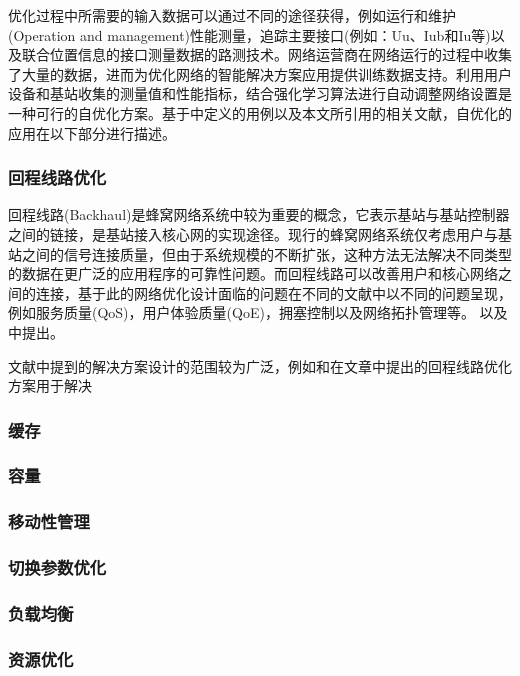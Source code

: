 \documentclass{IEEEtran}
\begin{document}
优化过程中所需要的输入数据可以通过不同的途径获得，例如运行和维护(Operation and management)性能测量，追踪主要接口(例如：Uu、Iub和Iu等)以及联合位置信息的接口测量数据的路测技术。网络运营商在网络运行的过程中收集了大量的数据，进而为优化网络的智能解决方案应用提供训练数据支持。利用用户设备和基站收集的测量值和性能指标，结合强化学习算法进行自动调整网络设置是一种可行的自优化方案。基于\cite{3gpp.36.902}中定义的用例以及本文所引用的相关文献，自优化的应用在以下部分进行描述。

\subsubsection{回程线路优化}

回程线路(Backhaul)是蜂窝网络系统中较为重要的概念，它表示基站与基站控制器之间的链接，是基站接入核心网的实现途径。现行的蜂窝网络系统仅考虑用户与基站之间的信号连接质量，但由于系统规模的不断扩张，这种方法无法解决不同类型的数据在更广泛的应用程序的可靠性问题。而回程线路可以改善用户和核心网络之间的连接，基于此的网络优化设计面临的问题在不同的文献中以不同的问题呈现，例如服务质量(QoS)，用户体验质量(QoE)，拥塞控制以及网络拓扑管理等。\cite{Wainio2016} 以及\cite{Chernov2014} 中提出。

文献中提到的解决方案设计的范围较为广泛，例如\cite{Wainio2016}和\cite{Chen2015}在文章中提出的回程线路优化方案用于解决





\subsubsection{缓存}
\subsubsection{容量}
\subsubsection{移动性管理}
\subsubsection{切换参数优化}
\subsubsection{负载均衡}
\subsubsection{资源优化}
\end{document}
